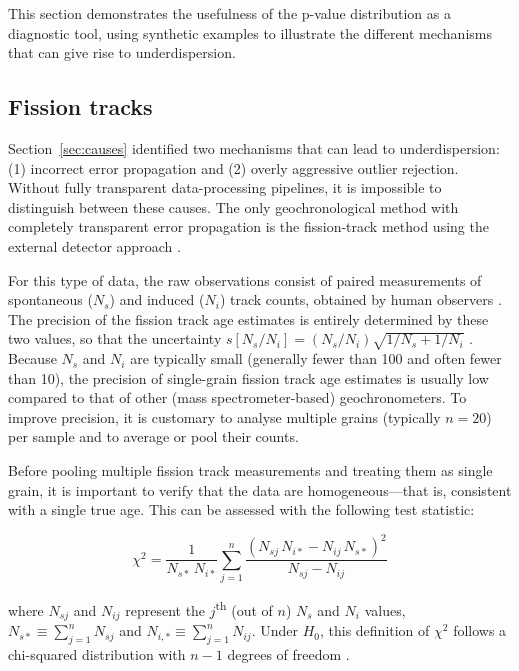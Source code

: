 \documentclass[gchron, manuscript]{copernicus}
\begin{document}
This section demonstrates the usefulness of the p-value distribution
as a diagnostic tool, using synthetic examples to illustrate the
different mechanisms that can give rise to underdispersion.

\subsection{Fission tracks}\label{sec:synthetic-FT}

Section~\ref{sec:causes} identified two mechanisms that can lead to
underdispersion: (1) incorrect error propagation and (2) overly
aggressive outlier rejection. Without fully transparent
data-processing pipelines, it is impossible to distinguish between
these causes. The only geochronological method with completely
transparent error propagation is the fission-track method using the
external detector approach \citep{hurford1983}.\medskip

For this type of data, the raw observations consist of paired
measurements of spontaneous ($N_s$) and induced ($N_i$) track counts,
obtained by human observers \citep[or by computer algorithms trained
  by human observers;][]{nachtergaele2021,boone2025}. The precision of
the fission track age estimates is entirely determined by these two
values, so that the uncertainty $s[N_s/N_i] = (N_s/N_i)
\sqrt{1/N_s+1/N_i}$ \citep{galbraith1981}. Because $N_s$ and $N_i$ are
typically small (generally fewer than 100 and often fewer than 10),
the precision of single-grain fission track age estimates is usually
low compared to that of other (mass spectrometer-based)
geochronometers. To improve precision, it is customary to analyse
multiple grains (typically $n=20$) per sample and to average or pool
their counts.\medskip

Before pooling multiple fission track measurements and treating them
as single grain, it is important to verify that the data are
homogeneous---that is, consistent with a single true age. This can be
assessed with the following test statistic:

\begin{equation}
  \chi^2 = \dfrac{1}{N_{s\ast}\,N_{i\ast}}
  \sum\limits_{j=1}^{n}\dfrac{\left(N_{sj}\,N_{i\ast}-N_{ij}\,N_{s\ast}\right)^2}
             {N_{sj}-N_{ij}}
\end{equation}

\noindent where $N_{sj}$ and $N_{ij}$ represent the
$j$\textsuperscript{th} (out of $n$) $N_s$ and $N_i$ values,
$N_{s\ast}\equiv\sum_{j=1}^nN_{sj}$ and
$N_{i,\ast}\equiv\sum_{j=1}^nN_{ij}$. Under $H_0$, this definition of
$\chi^2$ follows a chi-squared distribution with $n-1$ degrees of
freedom \citep{galbraith1993}.\medskip
\end{document}
